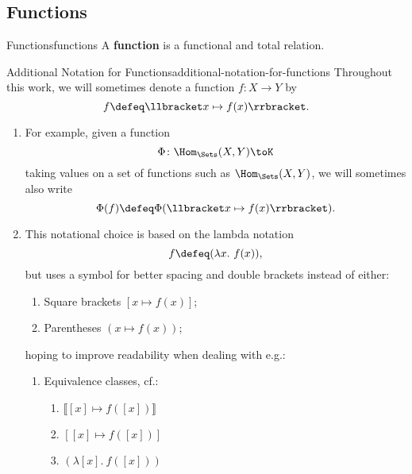 \subsection{Functions}\label{subsection-sets-and-functions-functions}
\begin{definition}{Functions}{functions}%
    A \textbf{function} is a functional and total relation.
\end{definition}
\begin{notation}{Additional Notation for Functions}{additional-notation-for-functions}%
    Throughout this work, we will sometimes denote a function $f\colon X\to Y$ by
    \[
        f%
        \defeq%
        \llbracket x\mapsto f(x)\rrbracket.%
    \]%
    \begin{enumerate}
        \item\label{additional-notation-for-functions-1}For example, given a function%
            \[
                \Phi%
                \colon%
                \Hom_{\Sets}(X,Y)%
                \to%
                K%
            \]%
            taking values on a set of functions such as $\Hom_{\Sets}(X,Y)$, we will sometimes also write
            \[
                \Phi(f)%
                \defeq%
                \Phi(\llbracket x\mapsto f(x)\rrbracket).%
            \]%
        \item\label{additional-notation-for-functions-2}This notational choice is based on the lambda notation
            \[
                f%
                \defeq%
                (\lambda x.\ f(x)),%
            \]%
            but uses a \say{$\mathord{\mapsto}$} symbol for better spacing and double brackets instead of either:
            \begin{enumerate}
                \item Square brackets $[x\mapsto f(x)]$;
                \item Parentheses $(x\mapsto f(x))$;
            \end{enumerate}
            hoping to improve readability when dealing with e.g.:
            \begin{enumerate}
                \item Equivalence classes, cf.:
                    \begin{enumerate}
                        \item $\llbracket[x]\mapsto f([x])\rrbracket$%
                        \item $[[x]\mapsto f([x])]$%
                        \item $(\lambda[x].\ f([x]))$%

\end{enumerate}
\end{enumerate}
\end{enumerate}
\end{notation}
